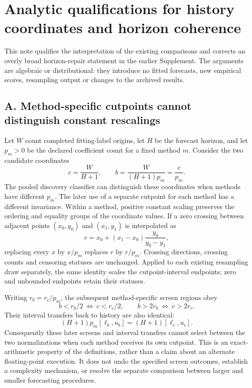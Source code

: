 \section{Analytic qualifications for history coordinates and horizon coherence}

This note qualifies the interpretation of the existing comparisons and corrects
an overly broad horizon-repair statement in the earlier Supplement. The
arguments are algebraic or distributional: they introduce no fitted forecasts,
new empirical scores, resampling output or changes to the archived results.

\subsection*{A. Method-specific cutpoints cannot distinguish constant rescalings}

Let \(W\) count completed fitting-label origins, let \(H\) be the forecast
horizon, and let \(p_m>0\) be the declared coefficient count for a fixed method
\(m\). Consider the two candidate coordinates
\[
c=\frac{W}{H+1},\qquad
b=\frac{W}{(H+1)p_m}=\frac{c}{p_m}.
\]
The pooled discovery classifier can distinguish these coordinates when methods
have different \(p_m\). The later use of a separate cutpoint for each method
has a different invariance. Within a method, positive constant scaling
preserves the ordering and equality groups of the coordinate values. If a
zero crossing between adjacent points \((x_0,y_0)\) and \((x_1,y_1)\) is
interpolated as
\[
r=x_0+(x_1-x_0)\frac{y_0}{y_0-y_1},
\]
replacing every \(x\) by \(x/p_m\) replaces \(r\) by \(r/p_m\). Crossing
directions, crossing counts and censoring statuses are unchanged. Applied to
each existing resampling draw separately, the same identity scales the
cutpoint-interval endpoints; zero and unbounded endpoints retain their
statuses.

Writing \(r_b=r_c/p_m\), the subsequent method-specific screen regions obey
\[
b<r_b/2\ \Longleftrightarrow\ c<r_c/2,
\qquad
b>2r_b\ \Longleftrightarrow\ c>2r_c.
\]
Their interval transfers back to history are also identical:
\[
(H+1)p_m[\ell_b,u_b]=(H+1)[\ell_c,u_c].
\]
Consequently these later screens and interval transfers cannot select between
the two normalizations when each method receives its own cutpoint. This is an
exact-arithmetic property of the definitions, rather than a claim about an
alternate floating-point execution. It does not undo the specified screen
outcomes, establish a complexity mechanism, or resolve the separate
comparison between larger and smaller forecasting procedures.

